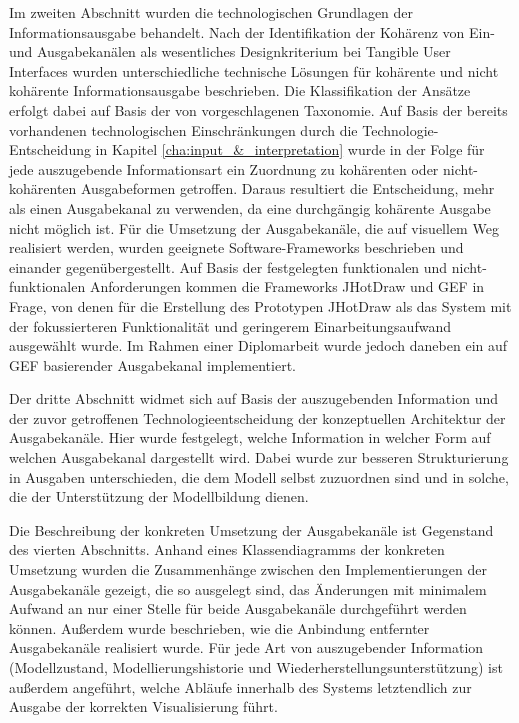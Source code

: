 Im zweiten Abschnitt wurden die technologischen Grundlagen der Informationsausgabe behandelt. Nach der Identifikation der Kohärenz von Ein- und Ausgabekanälen als wesentliches Designkriterium bei Tangible User Interfaces wurden unterschiedliche technische Lösungen für kohärente und nicht kohärente Informationsausgabe beschrieben. Die Klassifikation der Ansätze erfolgt dabei auf Basis der von \citep{Fishkin04} vorgeschlagenen Taxonomie. Auf Basis der bereits vorhandenen technologischen Einschränkungen durch die Technologie-Entscheidung in Kapitel \ref{cha:input_&_interpretation} wurde in der Folge für jede auszugebende Informationsart ein Zuordnung zu kohärenten oder nicht-kohärenten Ausgabeformen getroffen. Daraus resultiert die Entscheidung, mehr als einen Ausgabekanal zu verwenden, da eine durchgängig kohärente Ausgabe nicht möglich ist. Für die Umsetzung der Ausgabekanäle, die auf visuellem Weg realisiert werden, wurden geeignete Software-Frameworks beschrieben und einander gegenübergestellt. Auf Basis der festgelegten funktionalen und nicht-funktionalen Anforderungen kommen die Frameworks JHotDraw \citep{Gamma96} und \gls{GEF} \citep{Moore04} in Frage, von denen für die Erstellung des Prototypen JHotDraw als das System mit der fokussierteren Funktionalität und geringerem Einarbeitungsaufwand ausgewählt wurde. Im Rahmen einer Diplomarbeit \citep{Feiner08} wurde jedoch daneben ein auf \gls{GEF} basierender Ausgabekanal implementiert.

Der dritte Abschnitt widmet sich auf Basis der auszugebenden Information und der zuvor getroffenen Technologieentscheidung der konzeptuellen Architektur der Ausgabekanäle. Hier wurde festgelegt, welche Information in welcher Form auf welchen Ausgabekanal dargestellt wird. Dabei wurde zur besseren Strukturierung in Ausgaben unterschieden, die dem Modell selbst zuzuordnen sind und in solche, die der Unterstützung der Modellbildung dienen.

Die Beschreibung der konkreten Umsetzung der Ausgabekanäle ist Gegenstand des vierten Abschnitts. Anhand eines Klassendiagramms der konkreten Umsetzung wurden die Zusammenhänge zwischen den Implementierungen der Ausgabekanäle gezeigt, die so ausgelegt sind, das Änderungen mit minimalem Aufwand an nur einer Stelle für beide Ausgabekanäle durchgeführt werden können. Außerdem wurde beschrieben, wie die Anbindung entfernter Ausgabekanäle realisiert wurde. Für jede Art von auszugebender Information (Modellzustand, Modellierungshistorie und Wiederherstellungsunterstützung) ist außerdem angeführt, welche Abläufe innerhalb des Systems letztendlich zur Ausgabe der korrekten Visualisierung führt. 

